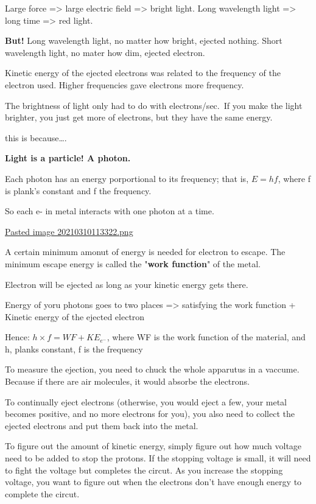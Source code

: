 \documentclass[letterpaper]{article}
\begin{document}
Large force => large electric field => bright light. Long wavelength
light => long time => red light.

\textbf{But!} Long wavelength light, no matter how bright, ejected nothing.
Short wavelength light, no mater how dim, ejected electron.

Kinetic energy of the ejected electrons was related to the frequency of
the electron used. Higher frequencies gave electrons more frequency.

The brightness of light only had to do with electrons/sec. If you make
the light brighter, you just get more of electrons, but they have the
same energy.

this is because\ldots{}.

\textbf{Light is a particle! A photon.}

Each photon has an energy porportional to its frequency; that is,
\(E=hf\), where f is plank's constant and f the frequency.

So each e- in metal interacts with one photon at a time.

\href{Pasted image 20210310113322.png.org}{Pasted image
20210310113322.png}

A certain minimum amonut of energy is needed for electron to escape. The
minimum escape energy is called the "\textbf{work function}" of the metal.

Electron will be ejected as long as your kinetic energy gets there.

Energy of yoru photons goes to two places => satisfying the work
function + Kinetic energy of the ejected electron

Hence: \(h \times f = WF + KE_{e^-}\), where WF is the work function of
the material, and h, planks constant, f is the frequency

To measure the ejection, you need to chuck the whole apparutus in a
vaccume. Because if there are air molecules, it would absorbe the
electrons.

To continually eject electrons (otherwise, you would eject a few, your
metal becomes positive, and no more electrons for you), you also need to
collect the ejected electrons and put them back into the metal.

To figure out the amount of kinetic energy, simply figure out how much
voltage need to be added to stop the protons. If the stopping voltage is
small, it will need to fight the voltage but completes the circut. As
you increase the stopping voltage, you want to figure out when the
electrons don't have enough energy to complete the circut.
\end{document}
